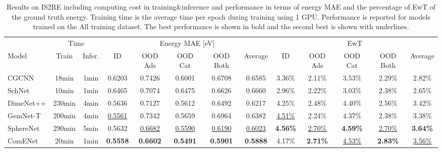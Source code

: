 \documentclass{article}
\begin{document}
\begin{table*}[t]
    \begin{center}
\caption{Results on IS2RE including computing cost in training\&inference
        and performance in terms of
        energy MAE and the percentage of EwT of the ground truth energy. 
        Training time is the average time per epoch during training using 1 GPU.
        Performance is reported for models trained on the All training dataset.
        The best performance is shown in bold and the second best is shown with underlines.
        }
\label{tb:result_oc20}
    \resizebox{\textwidth}{!}
    {\begin{tabular}{l cc | ccccc | ccccc  }
    \toprule
    & \multicolumn{2}{c|}{Time } &\multicolumn{5}{c|}{Energy MAE [eV] } & \multicolumn{5}{c}{EwT }  \\
    \cmidrule(l{4pt}r{4pt}){2-3}
    \cmidrule(l{4pt}r{4pt}){4-8}
    \cmidrule(l{4pt}r{4pt}){9-13}
 Model &Train &Infer. & ID &  OOD Ads & OOD Cat & OOD Both &Average& ID &  OOD Ads & OOD Cat & OOD Both &Average\\
\midrule
CGCNN &18min &1min &0.6203 &0.7426 &0.6001 &0.6708 &0.6585 &3.36\% &2.11\% &3.53\% &2.29\% &2.82\% \\
SchNet &10min &1min &0.6465 &0.7074 &0.6475 &0.6626 &0.6660 &2.96\% &2.22\% &3.03\% &2.38\% &2.65\% \\
DimeNet++ &230min &4min &0.5636 &0.7127 &0.5612 &0.6492 &0.6217 &4.25\% &2.48\% &4.40\% &2.56\% &3.42\% \\
GemNet-T &200min &4min &\underline{0.5561} &0.7342 &0.5659 &0.6964 &0.6382 &\underline{4.51\%} &2.24\% &4.37\% &2.38\% &3.38\% \\
SphereNet &290min &5min &0.5632 &\underline{0.6682} &\underline{0.5590} &\underline{0.6190} &\underline{0.6023} &\textbf{4.56\%} &\underline{2.70\%} &\textbf{4.59\%} &\underline{2.70\%} &\textbf{3.64\%} \\
ComENet &20min &1min &\textbf{0.5558} &\textbf{0.6602} &\textbf{0.5491} &\textbf{0.5901} &\textbf{0.5888} &4.17\% &\textbf{2.71\%} &\underline{4.53\%} &\textbf{2.83\%} &\underline{3.56\%} \\
\bottomrule
\end{tabular}}
\end{center}
\end{table*}
\end{document}
